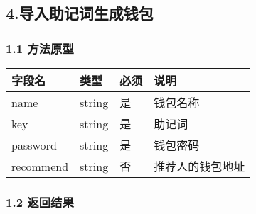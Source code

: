 \documentclass[letterpaper,10pt,english]{sphinxmanual}
\begin{document}

\begin{sphinxVerbatim}[commandchars=\\\{\}]
     
\end{sphinxVerbatim}


\subsection{4.导入助记词生成钱包}
\label{\detokenize{BCBWalletSDK_u63a5_u53e3_u8bf4_u660e:id26}}

\subsubsection{1.1 方法原型}
\label{\detokenize{BCBWalletSDK_u63a5_u53e3_u8bf4_u660e:id27}}



\begin{savenotes}\sphinxattablestart
\centering
\begin{tabulary}{\linewidth}[t]{|T|T|T|T|}
\hline
\sphinxstyletheadfamily 
字段名
&\sphinxstyletheadfamily 
类型
&\sphinxstyletheadfamily 
必须
&\sphinxstyletheadfamily 
说明
\\
\hline
name
&
string
&
是
&
钱包名称
\\
\hline
key
&
string
&
是
&
助记词
\\
\hline
password
&
string
&
是
&
钱包密码
\\
\hline
recommend
&
string
&
否
&
推荐人的钱包地址
\\
\hline
\end{tabulary}
\par
\sphinxattableend\end{savenotes}


\subsubsection{1.2 返回结果}
\label{\detokenize{BCBWalletSDK_u63a5_u53e3_u8bf4_u660e:id28}}
\end{document}
